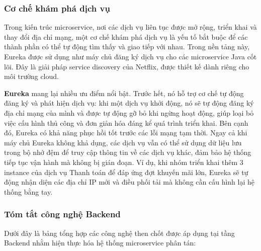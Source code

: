 \subsubsection{Cơ chế khám phá dịch vụ}

Trong kiến trúc microservice, nơi các dịch vụ liên tục được mở rộng, triển khai và thay đổi địa chỉ mạng, một cơ chế khám phá dịch vụ là yếu tố bắt buộc để các thành phần có thể tự động tìm thấy và giao tiếp với nhau. Trong nền tảng này, Eureka được sử dụng như máy chủ đăng ký dịch vụ cho các microservice Java cốt lõi. Đây là giải pháp service discovery của Netflix, được thiết kế dành riêng cho môi trường cloud.

\textbf{Eureka} mang lại nhiều ưu điểm nổi bật. Trước hết, nó hỗ trợ cơ chế tự động đăng ký và phát hiện dịch vụ: khi một dịch vụ khởi động, nó sẽ tự động đăng ký địa chỉ mạng của mình và được tự động gỡ bỏ khi ngừng hoạt động, giúp loại bỏ việc cấu hình thủ công và đơn giản hóa đáng kể quá trình triển khai\cite{eureka_autoconfig}. Bên cạnh đó, Eureka có khả năng phục hồi tốt trước các lỗi mạng tạm thời. Ngay cả khi máy chủ Eureka không khả dụng, các dịch vụ vẫn có thể sử dụng dữ liệu lưu trong bộ nhớ đệm để truy cập thông tin về các dịch vụ khác, đảm bảo hệ thống tiếp tục vận hành mà không bị gián đoạn\cite{eureka_resilience}. Ví dụ, khi nhóm triển khai thêm 3 instance của dịch vụ Thanh toán để đáp ứng đợt khuyến mãi lớn, Eureka sẽ tự động nhận diện các địa chỉ IP mới và điều phối tải mà không cần cấu hình lại hệ thống bằng tay.

\subsubsection{Tóm tắt công nghệ Backend}

Dưới đây là bảng tổng hợp các công nghệ then chốt được áp dụng tại tầng Backend nhằm hiện thực hóa hệ thống microservice phân tán:

